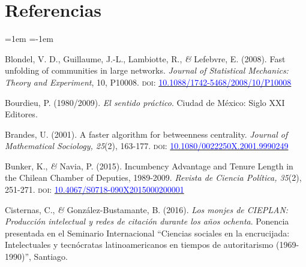 \documentclass[a4paper]{tufte-handout}
\begin{document}
{


\section{{\normalfont Referencias}}


\begin{list}{}%
{\leftmargin=1em \itemindent=-1em}

\item{\small Blondel, V. D., Guillaume, J.-L., Lambiotte, R., {\itshape \&} Lefebvre, E. (2008). Fast unfolding of communities in large networks. {\itshape Journal of Statistical Mechanics: Theory and Experiment}, 10, P10008. {\scshape doi:} \href{https://arxiv.org/abs/0803.0476}{\textcolor{blue}{10.1088/1742-5468/2008/10/P10008}}}

\item{\small Bourdieu, P. (1980/2009). {\itshape El sentido práctico}.  Ciudad de México: Siglo XXI Editores.}

\item{\small Brandes, U. (2001). A faster algorithm for betweenness centrality. {\itshape Journal of Mathematical Sociology, 25}(2), 163-177. {\scshape doi:} \href{https://doi.org/10.1080/0022250X.2001.9990249}{\textcolor{blue}{10.1080/0022250X.2001.9990249}}}

\item{\small Bunker, K., {\itshape \&} Navia, P. (2015). Incumbency Advantage and Tenure Length in the Chilean Chamber of Deputies, 1989-2009. {\itshape Revista de Ciencia Pol\'itica, 35}(2), 251-271. {\scshape doi:} \href{http://dx.doi.org/10.4067/S0718-090X2015000200001}{\textcolor{blue}{10.4067/S0718-090X2015000200001}}}

\item{\small Cisternas, C., {\itshape \&} González-Bustamante, B. (2016). {\itshape Los monjes de CIEPLAN: Producción intelectual y redes de citación durante los años ochenta}. Ponencia presentada en el Seminario Internacional “Ciencias sociales en la encrucijada: Intelectuales y tecnócratas latinoamericanos en tiempos de autoritarismo (1969-1990)”, Santiago.}


\end{list}}
\end{document}
